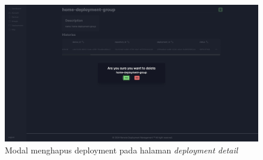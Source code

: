 \begin{figure}[h]
  \centering
  \includegraphics[width=1\textwidth]{resources/chapter-4/dashboard/deployment-detail-delete.jpg}
  \caption{Modal menghapus deployment pada halaman \textit{deployment detail}}
  \label{fig:halaman-deployment-detail-delete}
\end{figure}